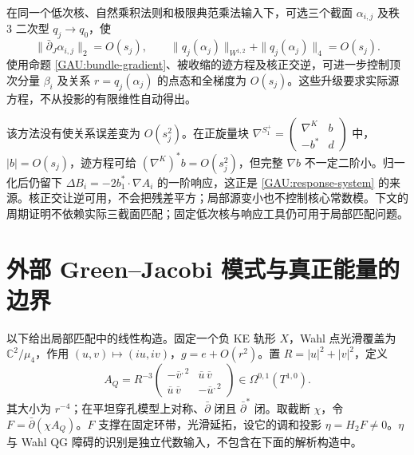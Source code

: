 \documentclass[UTF8,fontset=fandol,zihao=-4,oneside,openany]{ctexbook}
\theoremstyle{cjkplain}
\numberwithin{equation}{chapter}
\begin{document}
在同一个低次核、自然乘积法则和极限典范乘法输入下，可选三个截面 $\alpha_{i,j}$ 及秩 $3$ 二次型 $q_j\to q_0$，使
\begin{equation}\label{GAU:approximate-product}
\|\bar\partial_J\alpha_{i,j}\|_2=O(s_j),\qquad
\|q_j(\alpha_j)\|_{W^{1,2}}+\|q_j(\alpha_j)\|_4=O(s_j).
\end{equation}
使用命题 \ref{GAU:bundle-gradient}、被收缩的迹方程及核正交逆，可进一步控制顶次分量 $\beta_i$ 及关系 $r=q_j(\alpha_j)$ 的点态和全梯度为 $O(s_j)$。这些升级要求实际源方程，不从投影的有限维性自动得出。

该方法没有使关系误差变为 $O(s_j^2)$。在正旋量块
$\nabla^{S_1^+}=\left(\begin{smallmatrix}\nabla^K&b\\-b^*&d\end{smallmatrix}\right)$
中，$|b|=O(s_j)$，迹方程可给 $(\nabla^K)^*b=O(s_j^2)$，但完整 $\nabla b$ 不一定二阶小。归一化后仍留下
$\Delta B_i=-2b_1^*\!\cdot\nabla A_i$ 的一阶响应，这正是 \eqref{GAU:response-system} 的来源。核正交让逆可用，不会把残差平方；局部源变小也不控制核心常数模。下文的周期证明不依赖实际三截面匹配；固定低次核与响应工具仍可用于局部匹配问题。

\section{外部 Green--Jacobi 模式与真正能量的边界}
\label{GAU:Green}

以下给出局部匹配中的线性构造。固定一个负 KE 轨形 $X$，Wahl 点光滑覆盖为 $\mathbb C^2/\mu_4$，作用 $(u,v)\mapsto(iu,iv)$，$g=e+O(r^2)$。置 $R=|u|^2+|v|^2$，定义
\begin{equation}\label{GAU:AQ}
A_Q=R^{-3}\begin{pmatrix}-\overline v^{,2}&\overline u\,\overline v\\
\overline u\,\overline v&-\overline u^{,2}\end{pmatrix}
\in\Omega^{0,1}(T^{1,0}).
\end{equation}
其大小为 $r^{-4}$；在平坦穿孔模型上对称、$\bar\partial$ 闭且 $\bar\partial^*$ 闭。取截断 $\chi$，令 $F=\bar\partial(\chi A_Q)$。$F$ 支撑在固定环带，光滑延拓，设它的调和投影 $\eta=H_2F\ne0$。$\eta$ 与 Wahl QG 障碍的识别是独立代数输入，不包含在下面的解析构造中。
\end{document}

